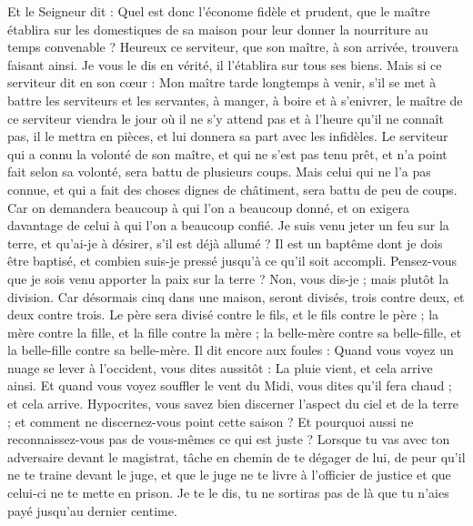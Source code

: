 \begin{multicols}{2}
Et le Seigneur dit : Quel est donc l’économe fidèle et prudent, que le maître établira sur les domestiques de sa maison pour leur donner la nourriture au temps convenable ?
Heureux ce serviteur, que son maître, à son arrivée, trouvera faisant ainsi.
Je vous le dis en vérité, il l'établira sur tous ses biens.
Mais si ce serviteur dit en son cœur : Mon maître tarde longtemps à venir, s’il se met à battre les serviteurs et les servantes, à manger, à boire et à s'enivrer,
le maître de ce serviteur viendra le jour où il ne s’y attend pas et à l'heure qu'il ne connaît pas, il le mettra en pièces, et lui donnera sa part avec les infidèles.
Le serviteur qui a connu la volonté de son maître, et qui ne s'est pas tenu prêt, et n'a point fait selon sa volonté, sera battu de plusieurs coups.
Mais celui qui ne l'a pas connue, et qui a fait des choses dignes de châtiment, sera battu de peu de coups. Car on demandera beaucoup à qui l’on a beaucoup donné, et on exigera davantage de celui à qui l’on a beaucoup confié.
Je suis venu jeter un feu sur la terre, et qu’ai-je à désirer, s'il est déjà allumé ?
Il est un baptême dont je dois être baptisé, et combien suis-je pressé jusqu'à ce qu'il soit accompli.
Pensez-vous que je sois venu apporter la paix sur la terre ? Non, vous dis-je ; mais plutôt la division.
Car désormais cinq dans une maison, seront divisés, trois contre deux, et deux contre trois.
Le père sera divisé contre le fils, et le fils contre le père ; la mère contre la fille, et la fille contre la mère ; la belle-mère contre sa belle-fille, et la belle-fille contre sa belle-mère.
Il dit encore aux foules : Quand vous voyez un nuage se lever à l'occident, vous dites aussitôt : La pluie vient, et cela arrive ainsi.
Et quand vous voyez souffler le vent du Midi, vous dites qu'il fera chaud ; et cela arrive.
Hypocrites, vous savez bien discerner l’aspect du ciel et de la terre ; et comment ne discernez-vous point cette saison ?
Et pourquoi aussi ne reconnaissez-vous pas de vous-mêmes ce qui est juste ?
\TextTitle{[La réconciliation]}
Lorsque tu vas avec ton adversaire devant le magistrat, tâche en chemin de te dégager de lui, de peur qu’il ne te traine devant le juge, et que le juge ne te livre à l’officier de justice et que celui-ci ne te mette en prison.
Je te le dis, tu ne sortiras pas de là que tu n’aies payé jusqu’au dernier centime.

\end{multicols}
